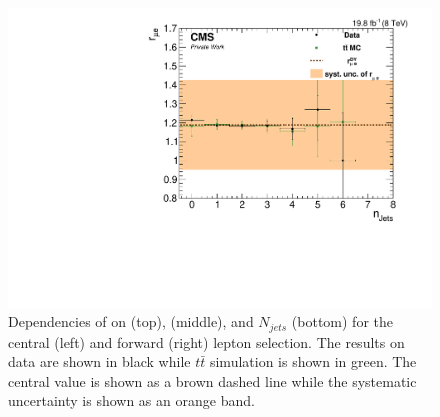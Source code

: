 \begin{figure}[htbp]
\begin{minipage}[t]{0.49\textwidth}
\includegraphics[width=\textwidth]{plots/BG/rmue/8TeVrRatioDataVsMCControl_nJets_Forward_Full2012.pdf}
\end{minipage}
\caption{Dependencies of \rmue on \mll (top), \MET (middle), and $N_{jets}$ (bottom) for the central (left) and forward (right) lepton selection. The results on data are shown in black while $t\bar{t}$ simulation is shown in green. The central value is shown as a brown dashed line while the systematic uncertainty is shown as an orange band.}
\label{fig:rmueDependencies}
\end{figure} 
